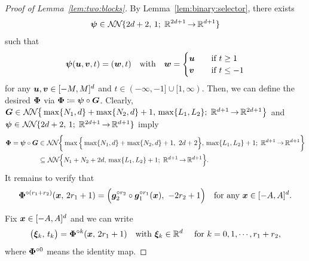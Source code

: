 \documentclass[nohyperref]{article}
\theoremstyle{plain}
\theoremstyle{definition}
\theoremstyle{remark}
\begin{document}
\begin{proof}[Proof of Lemma~\ref{lem:two:blocks}]
		By Lemma~\ref{lem:binary:selector}, there exists 
		\begin{equation*}
			\bmpsi\in \nn{2d+2}{1}{2d+1}{d+1}
		\end{equation*}
		such that
		\begin{equation}
			\label{eq:bmphi0:def}
			{\bm{\psi}}({\bm{u}},{\bm{v}},t)=({\bm{w}},t)\quad \textnormal{with}\quad 
			{\bm{w}}=\begin{cases}
				{\bm{u}} \quad & \textnormal{if}\  t\ge 1  \\
				{\bm{v}} \quad  & \textnormal{if}\  t\le -1
			\end{cases}
		\end{equation}
		for any ${\bm{u}},{\bm{v}} \in [-M,M]^d$ and $t\in (-\infty,-1]\cup[1,\infty)$.
		Then, we can define the desired ${\bm{\Phi}}$ via ${\bm{\Phi}}\coloneqq {\bm{\psi}}\circ {\bm{G}}$. Clearly, 
		$\bmG\in \nn[\big]{\max\{N_1,d\}+\max\{N_2,d\}+1}{\max\{L_1,L_2\}}{d+1}{2d+1}$ and  $\bmpsi\in \nn{2d+2}{1}{2d+1}{d+1}$
		imply
		\begin{equation*}
			\begin{split}
				\bmPhi=\bmpsi\circ\bmG
				&\in \nn[\bigg]{\max\Big\{\max\{N_1,d\}+\max\{N_2,d\}+1,\  2d+2\Big\}}{\max\{L_1,L_2\}+1}{d+1}{d+1}\\
				&\subseteq \nn[\Big]{N_1+N_2+2d}{\max\{L_1,L_2\}+1}{d+1}{d+1}.
			\end{split}
		\end{equation*}
		It remains to verify that
		\begin{equation*}
			{\bm{\Phi}}^{\circ (r_1+r_2)}({\bm{x}},\,2r_1+1)=\Big({\bm{g}}_2^{\circ r_2}\circ {\bm{g}}_1^{\circ r_1}({\bm{x}}),\  -2r_2+1\Big)\quad \textnormal{for any ${\bm{x}}\in [-A,A]^d$.}
		\end{equation*}
		
		Fix ${\bm{x}}\in [-A,A]^d$
		and we can write
		\begin{equation*}
			\big(\bmxi_k,\, t_k\big)=\bmPhi^{\circ k}(\bmx,\,2r_1+1)\quad \tn{with $\bmxi_k\in \R^d$ \quad for  $k=0,1,\dotsc,r_1+r_2$},
		\end{equation*}
  where ${\bm{\Phi}}^{\circ 0}$ means the identity map.   
  

\end{proof}
\end{document}
